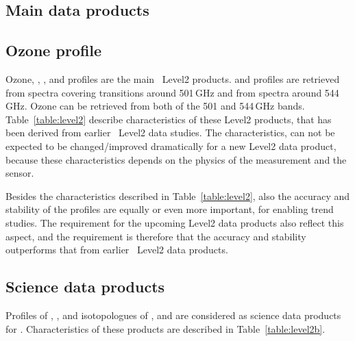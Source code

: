 
\subsection{Main data products}
\subsection*{Ozone profile}

Ozone, , , and  profiles
are the main \smr\ Level2 products.
 and  profiles are retrieved from spectra covering
transitions around 501\,GHz and  from spectra around 544\,GHz.
Ozone can be retrieved from both of the 501 and 544\,GHz bands.
Table~\ref{table:level2} describe characteristics of these Level2 products,
that has been derived from earlier \smr\ Level2 data studies.
The characteristics, can not be expected to be changed/improved dramatically
for a new Level2 data product,
because these characteristics depends on the physics of the measurement and
the sensor. 

Besides the characteristics described in Table~\ref{table:level2},
also the accuracy and stability of the profiles are equally
or even more important, for enabling trend studies. 
The requirement for the upcoming Level2 data products also reflect
this aspect, and the requirement is therefore that the accuracy
and stability outperforms that from earlier \smr\ Level2 data products. 




\subsection{Science data products}
Profiles of , , and isotopologues of , and 
are considered as science data products for \smr. 
Characteristics of these products are described in Table~\ref{table:level2b}.

